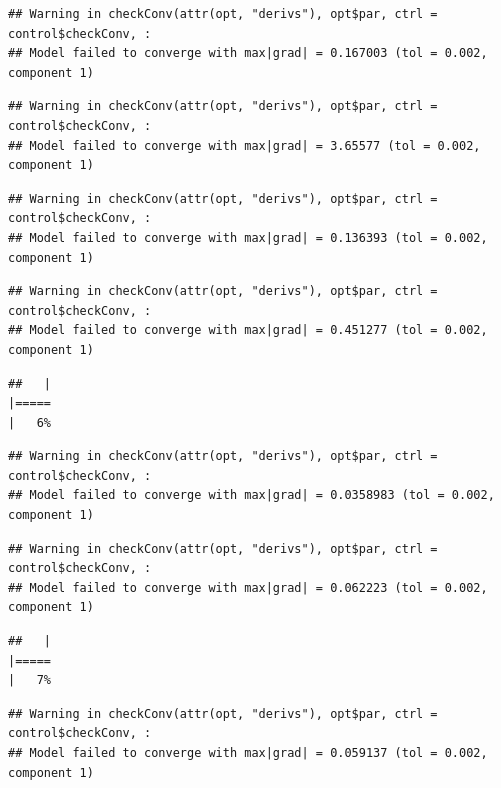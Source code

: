 \documentclass[
  12pt,
]{book}
\begin{document}
\begin{verbatim}
## Warning in checkConv(attr(opt, "derivs"), opt$par, ctrl = control$checkConv, :
## Model failed to converge with max|grad| = 0.167003 (tol = 0.002, component 1)
\end{verbatim}

\begin{verbatim}
## Warning in checkConv(attr(opt, "derivs"), opt$par, ctrl = control$checkConv, :
## Model failed to converge with max|grad| = 3.65577 (tol = 0.002, component 1)
\end{verbatim}

\begin{verbatim}
## Warning in checkConv(attr(opt, "derivs"), opt$par, ctrl = control$checkConv, :
## Model failed to converge with max|grad| = 0.136393 (tol = 0.002, component 1)
\end{verbatim}

\begin{verbatim}
## Warning in checkConv(attr(opt, "derivs"), opt$par, ctrl = control$checkConv, :
## Model failed to converge with max|grad| = 0.451277 (tol = 0.002, component 1)
\end{verbatim}

\begin{verbatim}
##   |                                                                              |=====                                                                 |   6%
\end{verbatim}

\begin{verbatim}
## Warning in checkConv(attr(opt, "derivs"), opt$par, ctrl = control$checkConv, :
## Model failed to converge with max|grad| = 0.0358983 (tol = 0.002, component 1)
\end{verbatim}

\begin{verbatim}
## Warning in checkConv(attr(opt, "derivs"), opt$par, ctrl = control$checkConv, :
## Model failed to converge with max|grad| = 0.062223 (tol = 0.002, component 1)
\end{verbatim}

\begin{verbatim}
##   |                                                                              |=====                                                                 |   7%
\end{verbatim}

\begin{verbatim}
## Warning in checkConv(attr(opt, "derivs"), opt$par, ctrl = control$checkConv, :
## Model failed to converge with max|grad| = 0.059137 (tol = 0.002, component 1)
\end{verbatim}
\end{document}
